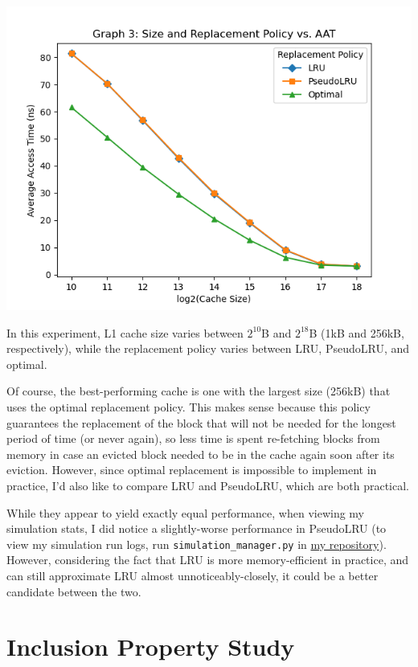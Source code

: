 \documentclass{article}
\begin{document}
    \includegraphics[width=\textwidth]{../graph_logs/graph3.png}

    In this experiment, L1 cache size varies between $2^{10}$B and $2^{18}$B (1kB and 256kB, respectively), while 
    the replacement policy varies between LRU, PseudoLRU, and optimal.

    Of course, the best-performing cache is one with the largest size (256kB) that uses the optimal replacement policy. 
    This makes sense because this policy guarantees the replacement of the block that will not be needed for the longest 
    period of time (or never again), so less time is spent re-fetching blocks from memory in case an evicted block 
    needed to be in the cache again soon after its eviction. However, since optimal replacement is impossible to implement 
    in practice, I'd also like to compare LRU and PseudoLRU, which are both practical.

    While they appear to yield exactly equal performance, when viewing my simulation stats, I did notice a slightly-worse 
    performance in PseudoLRU (to view my simulation run logs, run \texttt{simulation\_manager.py} in 
    \href{https://github.com/kobeeraveendran/cda5106/tree/master/hw/MachineProblem1_Fall2021/cachesim}
    {my repository}). However, considering the fact that LRU is more memory-efficient in practice, and can 
    still approximate LRU almost unnoticeably-closely, it could be a better candidate between the two.

    \newpage

    \section{Inclusion Property Study}
    
\end{document}
